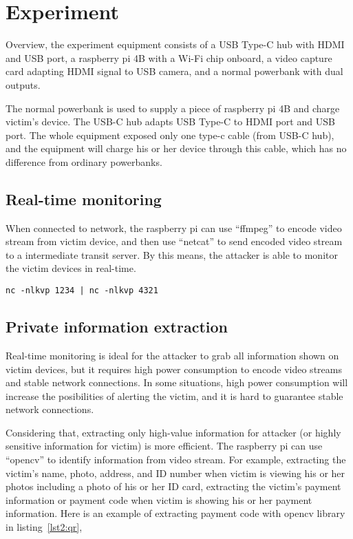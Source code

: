 \section{Experiment}
\label{section:experiment}

Overview, the experiment equipment consists of
a USB Type-C hub with HDMI and USB port,
a raspberry pi 4B with a Wi-Fi chip onboard,
a video capture card adapting HDMI signal to USB camera,
and a normal powerbank with dual outputs.

The normal powerbank is used to supply a piece of raspberry pi 4B and
charge victim's device.
The USB-C hub adapts USB Type-C to HDMI port and USB port.
 The whole equipment exposed only one type-c cable (from USB-C hub),
and the equipment will charge his or her device through this cable,
which has no difference from ordinary powerbanks.


\subsection{Real-time monitoring}

When connected to network,
the raspberry pi can use ``ffmpeg'' to encode video stream from victim device,
and then use ``netcat'' to send encoded video stream to a intermediate transit server.
By this means, the attacker is able to monitor the victim devices in real-time.

\begin{lstlisting}[caption={Precondition Checking for the Selfdestruct Call},label=lst1:mxm]
    nc -nlkvp 1234 | nc -nlkvp 4321

\end{lstlisting}


\subsection{Private information extraction}

Real-time monitoring is ideal for the attacker to grab all information shown on victim devices,
 but it requires high power consumption to encode video streams and stable network connections.
In some situations, high power consumption will increase the posibilities of alerting the victim,
and it is hard to guarantee stable network connections.

Considering that, extracting only high-value information for attacker (or highly sensitive information for victim) is more efficient.
The raspberry pi can use ``opencv'' to identify information from video stream.
For example, extracting the victim's name, photo, address, and ID number when victim is viewing his or her photos including a photo of his or her ID card,
extracting the victim's payment information or payment code when victim is showing his or her payment information.
Here is an example of extracting payment code with opencv library in listing~\ref{lst2:qr},

